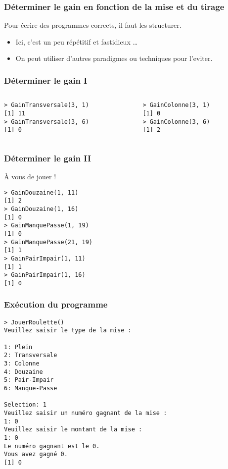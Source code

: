 \documentclass[10pt]{beamer}
\begin{document}
\begin{frame}[fragile]
  \frametitle{Déterminer le gain en fonction de la mise et du tirage}
  Pour écrire des programmes corrects, il faut les structurer.
  
  \begin{itemize}
  \item Ici, c'est un peu répétitif et fastidieux \dots
  \item On peut utiliser d'autres paradigmes ou techniques pour l'eviter.
  \end{itemize}

\end{frame}

\begin{frame}[fragile]
  \frametitle{Déterminer le gain I}
  
  
\begin{columns}[t]
\begin{column}{0.48\textwidth}
  \begin{lstlisting}
> GainTransversale(3, 1)
[1] 11
> GainTransversale(3, 6)
[1] 0
\end{lstlisting}
\end{column}
\begin{column}{0.48\textwidth}
  \begin{lstlisting}
> GainColonne(3, 1)
[1] 0
> GainColonne(3, 6)
[1] 2
  \end{lstlisting}
\end{column}
\end{columns}
\end{frame}
\begin{frame}[fragile]
  \frametitle{Déterminer le gain II}
  \begin{exampleblock}{À vous de jouer !}
    
  \end{exampleblock}
  \begin{lstlisting}
> GainDouzaine(1, 11)
[1] 2
> GainDouzaine(1, 16)
[1] 0
> GainManquePasse(1, 19)
[1] 0
> GainManquePasse(21, 19)
[1] 1
> GainPairImpair(1, 11)
[1] 1
> GainPairImpair(1, 16)
[1] 0
  \end{lstlisting}
\end{frame}

\begin{frame}[fragile]
  \frametitle{Exécution du programme}
  \begin{lstlisting}
> JouerRoulette()
Veuillez saisir le type de la mise :  

1: Plein
2: Transversale
3: Colonne
4: Douzaine
5: Pair-Impair
6: Manque-Passe

Selection: 1
Veuillez saisir un numéro gagnant de la mise :
1: 0
Veuillez saisir le montant de la mise :
1: 0
Le numéro gagnant est le 0.
Vous avez gagné 0.
[1] 0
\end{lstlisting}

\end{frame}
\end{document}
